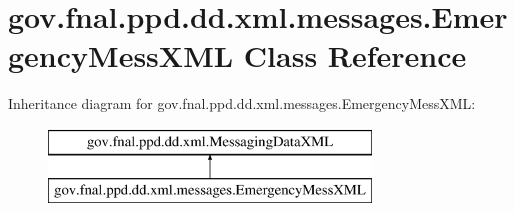 \hypertarget{classgov_1_1fnal_1_1ppd_1_1dd_1_1xml_1_1messages_1_1EmergencyMessXML}{\section{gov.\-fnal.\-ppd.\-dd.\-xml.\-messages.\-Emergency\-Mess\-X\-M\-L Class Reference}
\label{classgov_1_1fnal_1_1ppd_1_1dd_1_1xml_1_1messages_1_1EmergencyMessXML}
}
Inheritance diagram for gov.\-fnal.\-ppd.\-dd.\-xml.\-messages.\-Emergency\-Mess\-X\-M\-L\-:\begin{figure}[H]
\begin{center}
\leavevmode
\includegraphics[height=2.000000cm]{classgov_1_1fnal_1_1ppd_1_1dd_1_1xml_1_1messages_1_1EmergencyMessXML}
\end{center}
\end{figure}
